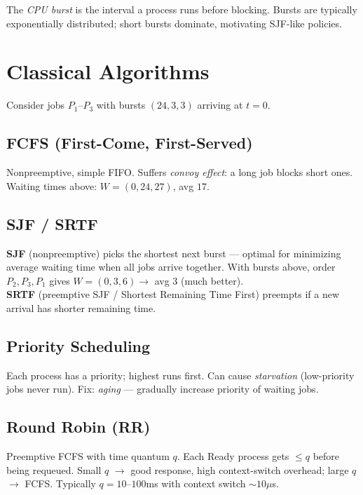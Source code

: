 \begin{definition}[Burst]
The \emph{CPU burst} is the interval a process runs before blocking. Bursts are
typically exponentially distributed; short bursts dominate, motivating SJF-like
policies.
\end{definition}

\section{Classical Algorithms}
\label{sec:classical-sched}

Consider jobs $P_1$--$P_3$ with bursts $(24,3,3)$ arriving at $t=0$.

\subsection{FCFS (First-Come, First-Served)}
Nonpreemptive, simple FIFO. Suffers \emph{convoy effect}: a long job blocks
short ones. Waiting times above: $W=(0,24,27)$, avg $17$.

\subsection{SJF / SRTF}
\textbf{SJF} (nonpreemptive) picks the shortest next burst --- optimal for
minimizing average waiting time when all jobs arrive together. With bursts
above, order $P_2,P_3,P_1$ gives $W=(0,3,6)\to$ avg $3$ (much better).\\
\textbf{SRTF} (preemptive SJF / Shortest Remaining Time First) preempts if a
new arrival has shorter remaining time.

\subsection{Priority Scheduling}
Each process has a priority; highest runs first. Can cause \emph{starvation}
(low-priority jobs never run). Fix: \emph{aging} --- gradually increase
priority of waiting jobs.

\subsection{Round Robin (RR)}
Preemptive FCFS with time quantum $q$. Each Ready process gets $\le q$ before
being requeued. Small $q$ $\to$ good response, high context-switch overhead;
large $q$ $\to$ FCFS. Typically $q=10$--$100$ms with context switch $\sim10\mu$s.

